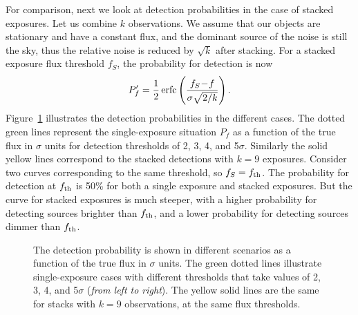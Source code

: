 \documentclass[twocolumn]{emulateapj}
\newcommand{\erfc}{{\rm{}erfc}}
\newcommand{\flux}{f}
\newcommand{\fth}{\flux_{\rm th}}
\begin{document}
For comparison, next we look at detection probabilities in the case of stacked exposures.
Let us combine $k$ observations.
We assume that our objects are stationary and have a constant flux, and the dominant source of the noise is still the sky, thus the relative noise is reduced by $\sqrt{k}$ after stacking.
For a stacked exposure flux threshold $f_S$, the probability for detection is now
%
\begin{equation}
P'_f = \frac{1}{2}\,\erfc\left(\frac{f_S\!-\!f}{\sigma\sqrt{2/k}}\right).
\end{equation}
%
Figure~\ref{fig:1} illustrates the detection probabilities in the different cases.
The dotted green lines represent the single-exposure situation $P_f$ as a function of the true flux in $\sigma$ units for detection thresholds of 2, 3, 4, and 5$\sigma$.
Similarly the solid yellow lines correspond to the stacked detections with \mbox{$k\!=\!9$} exposures.
Consider two curves corresponding to the same threshold, so $f_S = \fth$.
The probability for detection at $\fth$ is 50\% for both a single exposure and stacked exposures.
But the curve for stacked exposures is much steeper, with a higher probability for detecting sources brighter than $\fth$, and a lower probability for detecting sources dimmer than $\fth$.



\begin{figure}
\caption{The detection probability is shown in different scenarios as a function of the true flux in $\sigma$ units. The green dotted lines illustrate single-exposure cases with different thresholds that take values of 2, 3, 4, and 5$\sigma$ ({\it{}from left to right}). The yellow solid lines are the same for stacks with \mbox{$k\!=\!9$} observations, at the same flux thresholds.}
\label{fig:1}
\end{figure}


\end{document}
